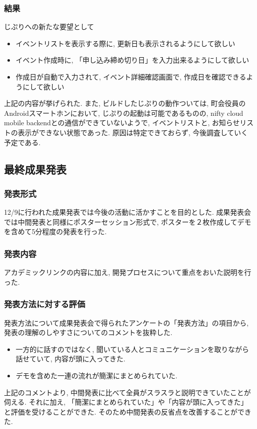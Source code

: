 \subsubsection{結果}
じぷりへの新たな要望として
\begin{itemize}
    \item イベントリストを表示する際に, 更新日も表示されるようにして欲しい
    \item イベント作成時に, 「申し込み締め切り日」を入力出来るようにして欲しい
    \item 作成日が自動で入力されて, イベント詳細確認画面で, 作成日を確認できるようにして欲しい
\end{itemize}
上記の内容が挙げられた.
また, ビルドしたじぷりの動作ついては,
町会役員のAndroidスマートホンにおいて, じぷりの起動は可能であるものの, nifty cloud mobile backendとの通信ができていないようで,
イベントリストと, お知らせリストの表示ができない状態であった. 原因は特定できておらず, 今後調査していく予定である.

\subsection{最終成果発表}
\subsubsection{発表形式}
12/9に行われた成果発表では今後の活動に活かすことを目的とした. 成果発表会では中間発表と同様にポスターセッション形式で, ポスターを２枚作成してデモを含めて5分程度の発表を行った.
\subsubsection{発表内容}
アカデミックリンクの内容に加え, 開発プロセスについて重点をおいた説明を行った.
\subsubsection{発表方法に対する評価}
発表方法について成果発表会で得られたアンケートの「発表方法」の項目から,  発表の理解のしやすさについてのコメントを抜粋した.
\begin{itemize}
    \item 一方的に話すのではなく, 聞いている人とコミュニケーションを取りながら話せていて, 内容が頭に入ってきた.
　\item デモを含めた一連の流れが簡潔にまとめられていた.
\end{itemize}
上記のコメントより, 中間発表に比べて全員がスラスラと説明できていたことが伺える. それに加え, 「簡潔にまとめられていた」や「内容が頭に入ってきた」と評価を受けることができた. そのため中間発表の反省点を改善することができた.
